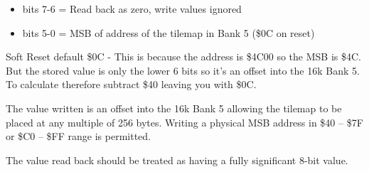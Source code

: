 \begin{itemize}
\item bits 7-6 = Read back as zero, write values ignored
\item bits 5-0 = MSB of address of the tilemap in Bank 5 (\$0C on
  reset)
\end{itemize}
Soft Reset default \$0C - This is because the address is \$4C00 so the
MSB is \$4C. But the stored value is only the lower 6 bits so it's an
offset into the 16k Bank 5. To calculate therefore subtract \$40
leaving you with \$0C.

The value written is an offset into the 16k Bank 5 allowing the
tilemap to be placed at any multiple of 256 bytes.  Writing a physical
MSB address in \$40 -- \$7F or \$C0 -- \$FF range is permitted.

The value read back should be treated as having a fully significant
8-bit value.

